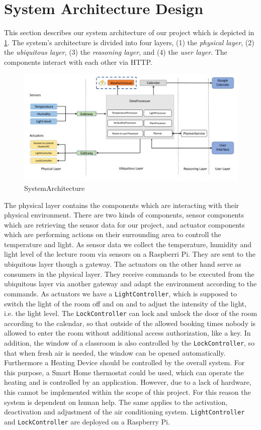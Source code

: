 \documentclass[runningheads]{llncs}
\begin{document}
\section{System Architecture Design}
\label{sec:sysad}
This section describes our system architecture of our project which is depicted in \cref{fig:SystemArchitecture}.
The system's architecture is divided into four layers, (1) the \textit{physical layer}, (2) the \textit{ubiquitous layer}, (3) the \textit{reasoning layer}, and (4) the \textit{user layer}.
The components interact with each other via HTTP.

\begin{figure}[H]
\centering
\includegraphics[width=1.0\textwidth]{../img/SystemArchitecture.pdf}
\caption{SystemArchitecture}
\label{fig:SystemArchitecture}
\end{figure}

The physical layer contains the components which are interacting with their physical environment.
There are two kinds of components, sensor components which are retrieving the sensor data for our project, and actuator components which are performing actions on their surrounding area to controll the temperature and light.
As sensor data we collect the temperature, humidity and light level of the lecture room via sensors on a Raspberri Pi.
They are sent to the ubiquitous layer though a gateway.
The actuators on the other hand serve as consumers in the physical layer.
They receive commands to be executed from the ubiquitous layer via another gateway and adapt the environment according to the commands.
As actuators we have a \texttt{LightController}, which is supposed to switch the light of the room off and on and to adjust the intensity of the light, i.e. the light level.
The \texttt{LockController} can lock and unlock the door of the room according to the calendar, so that outside of the allowed booking times nobody is allowed to enter the room without additional access authorization, like a key. In addition, the window of a classroom is also controlled by the \texttt{LockController}, so that when fresh air is needed, the window can be opened automatically. Furthermore a Heating Device should be controlled by the overall system.
For this purpose, a Smart Home thermostat could be used, which can operate the heating and is controlled by an application.
However, due to a lack of hardware, this cannot be implemented within the scope of this project.
For this reason the system is dependent on human help.
The same applies to the activation, deactivation and adjustment of the air conditioning system.
\texttt{LightController} and \texttt{LockController} are deployed on a Raspberry Pi.
\end{document}
